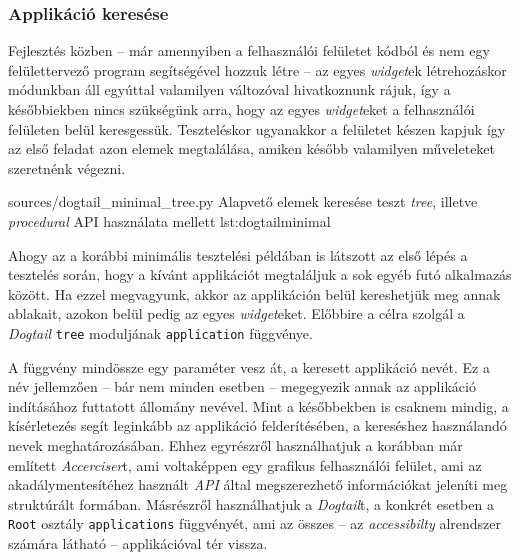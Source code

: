 \subsubsection{Applikáció keresése}

Fejlesztés közben -- már amennyiben a felhasználói felületet kódból és nem egy felülettervező program segítségével hozzuk létre -- az egyes \textit{widget}ek létrehozáskor módunkban áll egyúttal valamilyen változóval hivatkoznunk rájuk, így a későbbiekben nincs szükségünk arra, hogy az egyes \textit{widget}eket a felhasználói felületen belül keresgessük. Teszteléskor ugyanakkor a felületet készen kapjuk így az első feladat azon elemek megtalálása, amiken később valamilyen műveleteket szeretnénk végezni.

{sources/dogtail_minimal_tree.py}
{Alapvető elemek keresése teszt \textit{tree}, illetve \textit{procedural} API használata mellett}
{lst:dogtailminimal}


Ahogy az a korábbi minimális tesztelési példában is látszott az első lépés a tesztelés során, hogy a kívánt applikációt megtaláljuk a sok egyéb futó alkalmazás között. Ha ezzel megvagyunk, akkor az applikáción belül kereshetjük meg annak ablakait, azokon belül pedig az egyes \textit{widget}eket. Előbbire a célra szolgál a \textit{Dogtail} \texttt{tree} moduljának \texttt{application} függvénye.

A függvény mindössze egy paraméter vesz át, a keresett applikáció nevét. Ez a név jellemzően -- bár nem minden esetben -- megegyezik annak az applikáció indításához futtatott állomány nevével. Mint a későbbekben is csaknem mindig, a kísérletezés segít leginkább az applikáció felderítésében, a kereséshez használandó nevek meghatározásában. Ehhez egyrészről használhatjuk a korábban már említett \textit{Accerciser}t, ami voltaképpen egy grafikus felhasználói felület, ami az akadálymentesítéhez használt \textit{API} által megszerezhető információkat jeleníti meg struktúrált formában. Másrészről használhatjuk a \textit{Dogtail}t, a konkrét esetben a \texttt{Root} osztály \texttt{applications} függvényét, ami az összes -- az \textit{accessibilty} alrendszer számára látható -- applikációval tér vissza.

